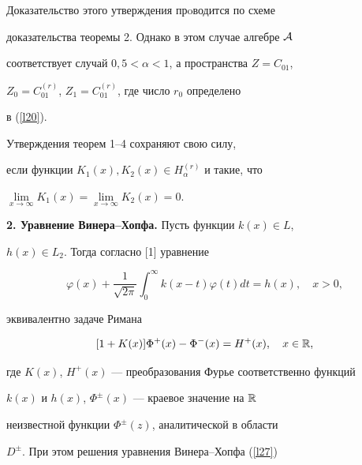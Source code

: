 Доказательство этого утверждения прoводится по схеме


доказательства теоремы 2. Однако в этом случае алгебре ${\cal A}$


соответствует случай $0{,}5<\alpha <1$, а пространства $Z=C_{01}$,


$Z_0=C_{01}^{(r)}$, $Z_1=C_{01}^{(r)}$, где число $r_0$ определено


в (\ref{l20}).








\begin{note}


Утверждения теорем 1--4 сохраняют свою силу,


если функции $K_1(x),  K_2(x)\in H_\alpha^{(r)}$ и такие, что


$\lim\limits_{x\rightarrow \infty}


K_1(x)=\lim\limits_{x\rightarrow \infty} K_2(x)=0$.


\end{note}








{\bf 2. Уравнение Винера--Хопфа.} Пусть функции $k(x)\in L$,


$h(x)\in L_2$. Тогда согласно [1] уравнение


\begin{equation}


\label{l28} \varphi(x)+\frac{1}{\sqrt{2\pi}}\int_0^\infty


k(x-t)\varphi(t)dt = h(x), \quad x > 0,


\end{equation}


эквивалентно задаче Римана


\begin{equation}


\label{l29} [1+K(x)]\Phi^+(x)-\Phi^-(x)=H^+(x), \quad x\in \Bbb R,


\end{equation}


где $K(x)$, $H^+(x)$ --- преобразования Фурье соответственно функций


$k(x)$ и $h(x)$, $\Phi^\pm(x)$ --- краевое значение на $\Bbb R$


неизвестной функции $\Phi^\pm(z)$, аналитической в области


$D^\pm$. При этом решения уравнения Винера--Хопфа (\ref{l27})


